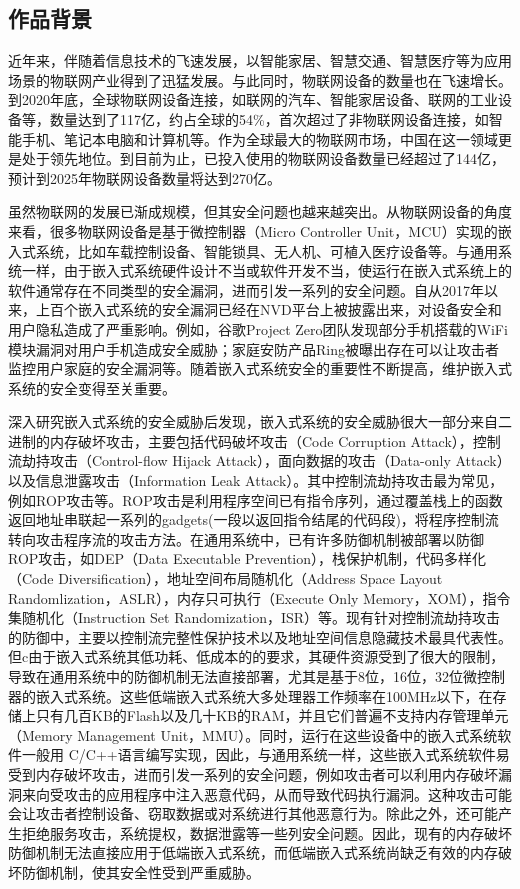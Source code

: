 \documentclass[UTF8,12pt,a4paper,twoside]{ctexart}
\numberwithin{figure}{section}
\begin{document}
\subsection{作品背景}
\par 近年来，伴随着信息技术的飞速发展，以智能家居、智慧交通、智慧医疗等为应用场景的物联网产业得到了迅猛发展。与此同时，物联网设备的数量也在飞速增长。到2020年底，全球物联网设备连接，如联网的汽车、智能家居设备、联网的工业设备等，数量达到了117亿，约占全球的54\%，首次超过了非物联网设备连接，如智能手机、笔记本电脑和计算机等。作为全球最大的物联网市场，中国在这一领域更是处于领先地位。到目前为止，已投入使用的物联网设备数量已经超过了144亿，预计到2025年物联网设备数量将达到270亿\cite{StateOfIOT}。
\par 虽然物联网的发展已渐成规模，但其安全问题也越来越突出。从物联网设备的角度来看，很多物联网设备是基于微控制器（Micro Controller Unit，MCU）实现的嵌入式系统，比如车载控制设备、智能锁具、无人机、可植入医疗设备等。与通用系统一样，由于嵌入式系统硬件设计不当或软件开发不当，使运行在嵌入式系统上的软件通常存在不同类型的安全漏洞，进而引发一系列的安全问题。自从2017年以来，上百个嵌入式系统的安全漏洞已经在NVD平台上被披露出来，对设备安全和用户隐私造成了严重影响。例如，谷歌Project Zero团队发现部分手机搭载的WiFi模块漏洞对用户手机造成安全威胁\cite{beniamini2017project}；家庭安防产品Ring被曝出存在可以让攻击者监控用户家庭的安全漏洞等\cite{Amazon}。随着嵌入式系统安全的重要性不断提高，维护嵌入式系统的安全变得至关重要。
\par 深入研究嵌入式系统的安全威胁后发现，嵌入式系统的安全威胁很大一部分来自二进制的内存破坏攻击，主要包括代码破坏攻击（Code Corruption Attack），控制流劫持攻击（Control-flow Hijack Attack），面向数据的攻击（Data-only Attack）以及信息泄露攻击（Information Leak Attack）\cite{clements2017protecting,papp2015embedded}。其中控制流劫持攻击最为常见，例如ROP攻击等。ROP攻击是利用程序空间已有指令序列，通过覆盖栈上的函数返回地址串联起一系列的gadgets(一段以返回指令结尾的代码段)，将程序控制流转向攻击程序流的攻击方法。在通用系统中\cite{cowan1998stackguard,angelfire,tanenbaum1997operating,bojinov2011address,backes2014you}，已有许多防御机制被部署以防御ROP攻击，如DEP（Data Executable Prevention），栈保护机制，代码多样化（Code Diversification），地址空间布局随机化（Address Space Layout Randomlization，ASLR），内存只可执行（Execute Only Memory，XOM），指令集随机化（Instruction Set Randomization，ISR）等。现有针对控制流劫持攻击的防御中，主要以控制流完整性保护技术以及地址空间信息隐藏技术最具代表性。但c由于嵌入式系统其低功耗、低成本的的要求，其硬件资源受到了很大的限制，导致在通用系统中的防御机制无法直接部署，尤其是基于8位，16位，32位微控制器的嵌入式系统\cite{PositionPaper}。这些低端嵌入式系统大多处理器工作频率在100MHz以下，在存储上只有几百KB的Flash以及几十KB的RAM，并且它们普遍不支持内存管理单元（Memory Management Unit，MMU）\cite{abbasi2019challenges,almakhdhub2020mu}。同时，运行在这些设备中的嵌入式系统软件一般用 C/C++语言编写实现，因此，与通用系统一样，这些嵌入式系统软件易受到内存破坏攻击，进而引发一系列的安全问题\cite{roemer2012return}，例如攻击者可以利用内存破坏漏洞来向受攻击的应用程序中注入恶意代码，从而导致代码执行漏洞。这种攻击可能会让攻击者控制设备、窃取数据或对系统进行其他恶意行为。除此之外，还可能产生拒绝服务攻击，系统提权，数据泄露等一些列安全问题。因此，现有的内存破坏防御机制无法直接应用于低端嵌入式系统，而低端嵌入式系统尚缺乏有效的内存破坏防御机制，使其安全性受到严重威胁。
\end{document}
